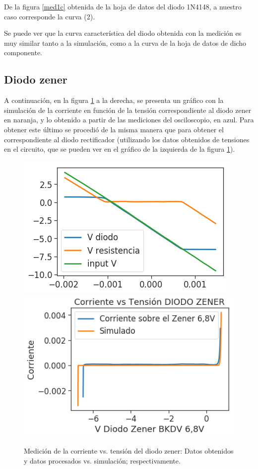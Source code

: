 De la figura \ref{med1c} obtenida de la hoja de datos del diodo 1N4148, a nuestro caso corresponde la curva (2).

Se puede ver que la curva caracter\'istica del diodo obtenida con la medici\'on es muy similar tanto a la simulaci\'on, como a la curva de la hoja de datos de dicho componente.

\subsection*{\color{orange}Diodo zener}

A continuaci\'on, en la figura \ref{med2b} a la derecha, se presenta un gr\'afico con la simulaci\'on de la corriente en funci\'on de la tensi\'on correspondiente al diodo zener en naranja, y lo obtenido a partir de las mediciones del osciloscopio, en azul. Para obtener este \'ultimo se procedi\'o de la misma manera que para obtener el correspondiente al diodo rectificador (utilizando los datos obtenidos de tensiones en el circuito, que se pueden ver en el gr\'afico de la izquierda de la figura \ref{med2b}).


\begin{figure}[H]
\centering
\includegraphics[scale=0.5]{../EJ1/DiodoZener/datosOsciloscopioZener}
\includegraphics[scale=0.5]{../EJ1/DiodoZener/zenerSuperpos}
\caption{Medici\'on de la corriente vs. tensi\'on del diodo zener: Datos obtenidos y datos procesados vs. simulación; respectivamente.}
\label{med2b}
\end{figure}

